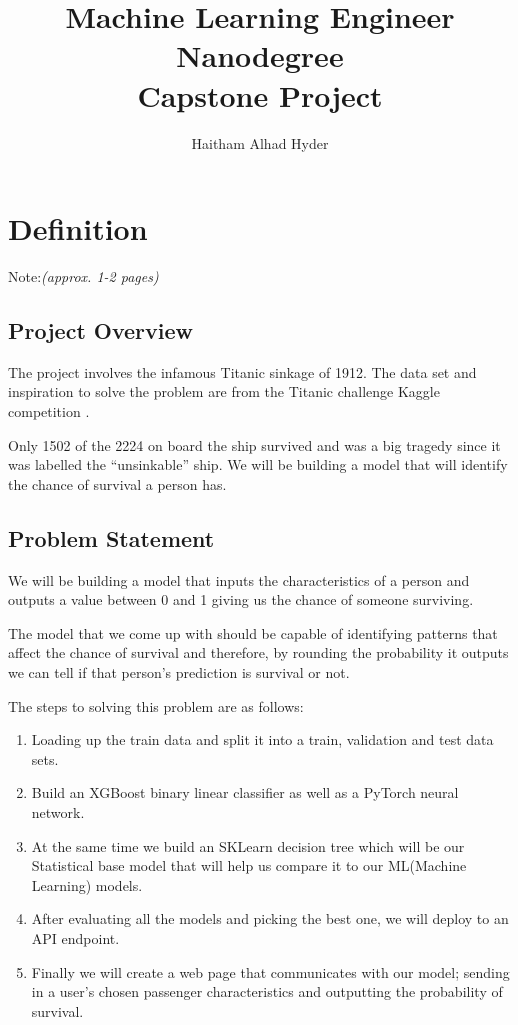 \documentclass{article}
\title{Machine Learning Engineer Nanodegree \\
\large Capstone Project}
\author{Haitham Alhad Hyder}
\begin{document}
\maketitle

\section{Definition}\label{definition}

Note:\emph{(approx. 1-2 pages)}

\subsection*{Project Overview}\label{project-overview}

The project involves the infamous Titanic sinkage of 1912. The data set
and inspiration to solve the problem are from the Titanic challenge
Kaggle competition \parencite{kaggle}.

Only 1502 of the 2224 on board the ship survived and was a big tragedy
since it was labelled the ``unsinkable'' ship. We will be building a
model that will identify the chance of survival a person has.

\subsection{Problem Statement}\label{problem-statement}

We will be building a model that inputs the characteristics of a person
and outputs a value between 0 and 1 giving us the chance of someone
surviving.

The model that we come up with should be capable of identifying patterns
that affect the chance of survival and therefore, by rounding the
probability it outputs we can tell if that person's prediction is
survival or not.

The steps to solving this problem are as follows:

\begin{enumerate}
\item
  Loading up the train data and split it into a train, validation and
  test data sets.
\item
  Build an XGBoost binary linear classifier as well as a PyTorch neural
  network.
\item
  At the same time we build an SKLearn decision tree which will be our
  Statistical base model that will help us compare it to our ML(Machine
  Learning) models.
\item
  After evaluating all the models and picking the best one, we will
  deploy to an API endpoint.
\item
  Finally we will create a web page that communicates with our model;
  sending in a user's chosen passenger characteristics and outputting
  the probability of survival.
\end{enumerate}
\end{document}
